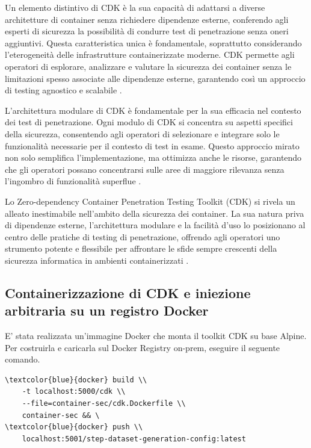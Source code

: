 Un elemento distintivo di CDK è la sua capacità di adattarsi a diverse architetture di container senza richiedere dipendenze esterne, conferendo agli esperti di sicurezza la possibilità di condurre test di penetrazione senza oneri aggiuntivi. Questa caratteristica unica è fondamentale, soprattutto considerando l'eterogeneità delle infrastrutture containerizzate moderne. CDK permette agli operatori di esplorare, analizzare e valutare la sicurezza dei container senza le limitazioni spesso associate alle dipendenze esterne, garantendo così un approccio di testing agnostico e scalabile \cite{cdk_modularity}.

L'architettura modulare di CDK è fondamentale per la sua efficacia nel contesto dei test di penetrazione. Ogni modulo di CDK si concentra su aspetti specifici della sicurezza, consentendo agli operatori di selezionare e integrare solo le funzionalità necessarie per il contesto di test in esame. Questo approccio mirato non solo semplifica l'implementazione, ma ottimizza anche le risorse, garantendo che gli operatori possano concentrarsi sulle aree di maggiore rilevanza senza l'ingombro di funzionalità superflue \cite{cdk_modularity}.

Lo Zero-dependency Container Penetration Testing Toolkit (CDK) si rivela un alleato inestimabile nell'ambito della sicurezza dei container. La sua natura priva di dipendenze esterne, l'architettura modulare e la facilità d'uso lo posizionano al centro delle pratiche di testing di penetrazione, offrendo agli operatori uno strumento potente e flessibile per affrontare le sfide sempre crescenti della sicurezza informatica in ambienti containerizzati \cite{cdk_future}.

\subsection{Containerizzazione di CDK e iniezione arbitraria su un registro Docker}

E' stata realizzata un'immagine Docker che monta il toolkit CDK su base Alpine. Per costruirla e caricarla sul Docker Registry on-prem, eseguire il seguente comando.

\begin{small}
\begin{Verbatim}[commandchars=\\\{\}]
\textcolor{blue}{docker} build \\
    -t localhost:5000/cdk \\
    --file=container-sec/cdk.Dockerfile \\
    container-sec && \
\textcolor{blue}{docker} push \\
    localhost:5001/step-dataset-generation-config:latest
\end{Verbatim}
\end{small}

